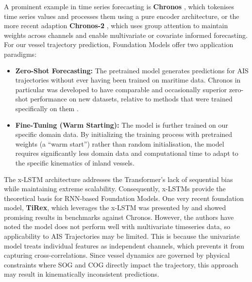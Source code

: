     A prominent example in time series forecasting is \textbf{Chronos} \parencite{ansari2024chronoslearninglanguagetime}, which tokenises time series values and processes them using a pure encoder architecture, or the more recent adaption \textbf{Chronos-2} \parencite{ansari2025chronos2}, which uses group attention to maintain weights across channels and enable multivariate or covariate informed forecasting. For our vessel trajectory prediction, Foundation Models offer two  application paradigms:
    \begin{itemize}
        \item \textbf{Zero-Shot Forecasting:} The pretrained model generates predictions for \ac{AIS} trajectories without ever having been trained on maritime data. Chronos in particular was developed to  have comparable and occasionally superior zero-shot performance on new datasets, relative to methods that were trained specifically on them \parencite{ansari2024chronoslearninglanguagetime}.
        \item \textbf{Fine-Tuning (Warm Starting):} The model is further trained on our specific domain data. By initializing the training process with pretrained weights (a \enquote{warm start}) rather than random initialisation, the model requires significantly less domain data and computational time to adapt to the specific kinematics of inland vessels. 
    \end{itemize}%

    
    The \ac{x-LSTM} architecture \parencite{beck2024xlstmextendedlongshortterm} addresses the Transformer's lack of sequential bias while maintaining extreme scalability. %
    Consequently, \acp{x-LSTM} provide the theoretical basis for \ac{RNN}-based Foundation Models. One very recent foundation model, \textbf{TiRex}, which leverages the \ac{x-LSTM} was presented by \textcite{auer2025tirexzeroshotforecastinglongtrex} and showed promising results in benchmarks against Chronos. However, the authors have noted the model does not perform well with multivariate timeseries data, so applicability to AIS Trajectories may be limited. This is because the univariate model  treats individual features as independent channels, which prevents it from capturing cross-correlations. Since vessel dynamics are governed by physical constraints where \ac{SOG} and \ac{COG} directly impact the trajectory, this  approach may result in kinematically inconsistent predictions.

